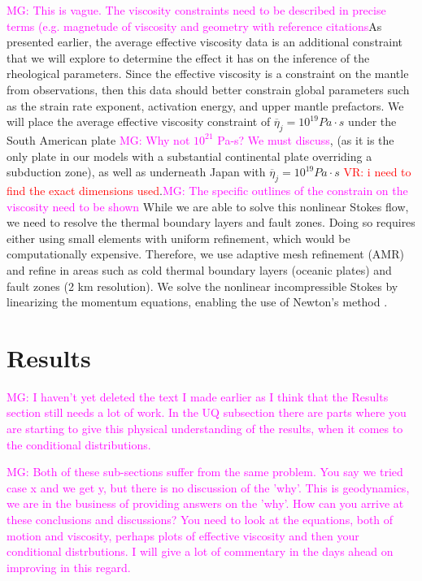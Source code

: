 \documentclass[12pt]{article}
\newcommand{\mgnote}[1]{\textcolor{magenta}{MG: #1}}
\newcommand{\vrnote}[1]{\textcolor{red}{VR: #1}}
\begin{document}
{\mgnote{This is vague. The viscosity constraints need to be described in precise terms (e.g. magnetude of viscosity and geometry with reference citations}As presented earlier, the average effective viscosity data is an additional constraint that we will explore to determine the effect it has on the inference of the rheological parameters. Since the effective viscosity is a constraint on the mantle from observations, then this data should better constrain global parameters such as the strain rate exponent, activation energy, and upper mantle prefactors. We will place the average effective viscosity constraint of $\overline{\eta}_j = 10^{19} Pa\cdot s$ under the South American plate \mgnote{Why not $10^21$ Pa-s? We must discuss}, (as it is the only plate in our models with a substantial continental plate overriding a subduction zone), as well as underneath Japan with $\overline{\eta}_j = 10^{19} Pa\cdot s$ \citep{hu2016asthenosphere} \vrnote{i need to find the exact dimensions used}.\mgnote{The specific outlines of the constrain on the viscosity need to be shown}
 While we are able to solve this nonlinear Stokes flow, we need to resolve the thermal boundary layers and fault zones. Doing so requires either using small elements with uniform refinement, which would be computationally expensive. Therefore, we use adaptive mesh refinement (AMR) and refine in areas such as cold thermal boundary layers (oceanic plates) and fault zones (2 km resolution). 
We solve the nonlinear incompressible Stokes by linearizing the momentum equations, enabling the use of Newton's method \citep{rudi2015extreme}. 

\section{Results}

\mgnote{I haven't yet deleted the text I made earlier as I think that the Results section still needs a lot of work. In the UQ subsection there are parts where you are starting to give this physical understanding of the results, when it comes to the conditional distributions.}

\mgnote{Both of these sub-sections suffer from the same problem. You say we tried case x and we get y, but there is no discussion of the 'why'. This is geodynamics, we are in the business of providing answers on the 'why'. How can you arrive at these conclusions and discussions? You need to look at the equations, both of motion and  viscosity, perhaps plots of effective viscosity and then your conditional distrbutions. I will give a lot of commentary in the days ahead on improving in this regard.}

}
\end{document}
